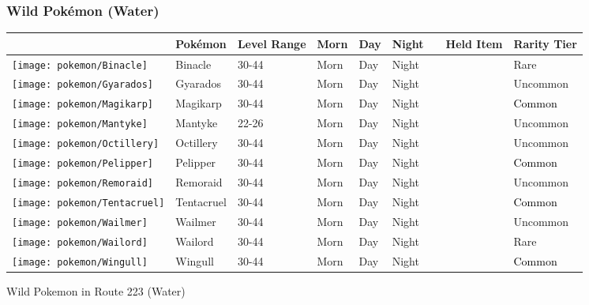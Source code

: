 \subsubsection{Wild Pokémon (Water)}%
\label{ssubsec:WildPokmon(Water)}%
\begin{longtable}{||l l l l l l l l l||}%
\hline%
\rowcolor{WaterColor}%
&Pokémon&Level Range&Morn&Day&Night&&Held Item&Rarity Tier\\%
\hline%
\endhead%
\hline%
\rowcolor{WaterColor}%
\texttt{[image: pokemon/Binacle]}&Binacle&30{-}44&Morn&Day&Night&&&\textcolor{RedOrange}{%
Rare%
}\\%
\hline%
\rowcolor{WaterColor}%
\texttt{[image: pokemon/Gyarados]}&Gyarados&30{-}44&Morn&Day&Night&&&\textcolor{OliveGreen}{%
Uncommon%
}\\%
\hline%
\rowcolor{WaterColor}%
\texttt{[image: pokemon/Magikarp]}&Magikarp&30{-}44&Morn&Day&Night&&&\textcolor{black}{%
Common%
}\\%
\hline%
\rowcolor{WaterColor}%
\texttt{[image: pokemon/Mantyke]}&Mantyke&22{-}26&Morn&Day&Night&&&\textcolor{OliveGreen}{%
Uncommon%
}\\%
\hline%
\rowcolor{WaterColor}%
\texttt{[image: pokemon/Octillery]}&Octillery&30{-}44&Morn&Day&Night&&&\textcolor{OliveGreen}{%
Uncommon%
}\\%
\hline%
\rowcolor{WaterColor}%
\texttt{[image: pokemon/Pelipper]}&Pelipper&30{-}44&Morn&Day&Night&&&\textcolor{black}{%
Common%
}\\%
\hline%
\rowcolor{WaterColor}%
\texttt{[image: pokemon/Remoraid]}&Remoraid&30{-}44&Morn&Day&Night&&&\textcolor{OliveGreen}{%
Uncommon%
}\\%
\hline%
\rowcolor{WaterColor}%
\texttt{[image: pokemon/Tentacruel]}&Tentacruel&30{-}44&Morn&Day&Night&&&\textcolor{black}{%
Common%
}\\%
\hline%
\rowcolor{WaterColor}%
\texttt{[image: pokemon/Wailmer]}&Wailmer&30{-}44&Morn&Day&Night&&&\textcolor{OliveGreen}{%
Uncommon%
}\\%
\hline%
\rowcolor{WaterColor}%
\texttt{[image: pokemon/Wailord]}&Wailord&30{-}44&Morn&Day&Night&&&\textcolor{RedOrange}{%
Rare%
}\\%
\hline%
\rowcolor{WaterColor}%
\texttt{[image: pokemon/Wingull]}&Wingull&30{-}44&Morn&Day&Night&&&\textcolor{black}{%
Common%
}\\%
\hline%
\end{longtable}%
\caption{Wild Pokemon in Route 223 (Water)}